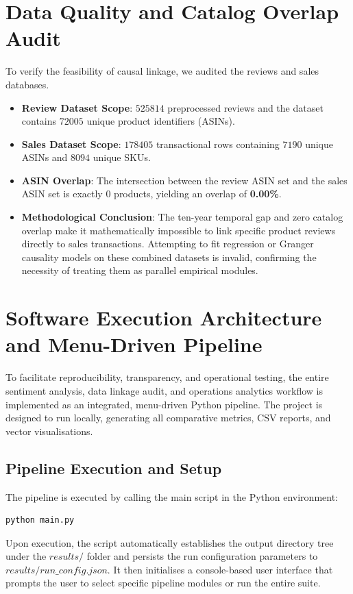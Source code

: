 \documentclass[11pt]{article}
\begin{document}
\section{Data Quality and Catalog Overlap Audit}
To verify the feasibility of causal linkage, we audited the reviews and sales databases.
\begin{itemize}
    \item \textbf{Review Dataset Scope}: $525814$ preprocessed reviews and the dataset contains $72005$ unique product identifiers (ASINs).
    \item \textbf{Sales Dataset Scope}: $178405$ transactional rows containing $7190$ unique ASINs and $8094$ unique SKUs.
    \item \textbf{ASIN Overlap}: The intersection between the review ASIN set and the sales ASIN set is exactly $0$ products, yielding an overlap of \textbf{0.00\%}.
    \item \textbf{Methodological Conclusion}: The ten-year temporal gap and zero catalog overlap make it mathematically impossible to link specific product reviews directly to sales transactions. Attempting to fit regression or Granger causality models on these combined datasets is invalid, confirming the necessity of treating them as parallel empirical modules.
\end{itemize}

\section{Software Execution Architecture and Menu-Driven Pipeline}
To facilitate reproducibility, transparency, and operational testing, the entire sentiment analysis, data linkage audit, and operations analytics workflow is implemented as an integrated, menu-driven Python pipeline. The project is designed to run locally, generating all comparative metrics, CSV reports, and vector visualisations.

\subsection{Pipeline Execution and Setup}
The pipeline is executed by calling the main script in the Python environment:
\begin{verbatim}
python main.py
\end{verbatim}

Upon execution, the script automatically establishes the output directory tree under the $results/$ folder and persists the run configuration parameters to $results/run\_config.json$. It then initialises a console-based user interface that prompts the user to select specific pipeline modules or run the entire suite.
\end{document}
